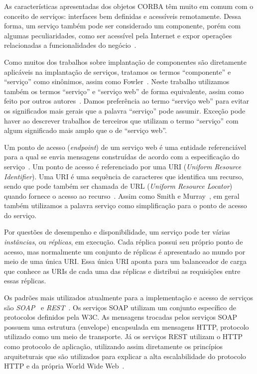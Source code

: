 As características apresentadas dos objetos CORBA têm muito em comum com o conceito de serviços: 
interfaces bem definidas e acessíveis remotamente.
Dessa forma, um serviço também pode ser considerado um componente, porém com algumas peculiaridades, 
como ser acessível pela Internet e expor operações relacionadas a funcionalidades do negócio~\cite{Hewitt2009JavaSOA}.

Como muitos dos trabalhos sobre implantação de componentes são diretamente aplicáveis na implantação de serviços, tratamos os termos ``componente'' e ``serviço'' como sinônimos, assim como Fowler~\cite{Fowler2004Inversion}. Neste trabalho utilizamos também os termos ``serviço'' e ``serviço web'' de forma equivalente, assim como feito por outros autores~\cite{Watson2006Dynasoar}. Damos preferência ao termo ``serviço web'' para evitar os significados mais gerais que a palavra ``serviço'' pode assumir. Exceção pode haver ao descrever trabalhos de terceiros que utilizam o termo ``serviço'' com algum significado mais amplo que o de ``serviço web''. 

Um ponto de acesso (\textit{endpoint}) de um serviço web é uma entidade referenciável para a qual se envia mensagens construídas de acordo com a especificação do serviço~\cite{W3C2004Addressing}. 
Um ponto de acesso é referenciado por uma URI (\emph{Uniform Resource Identifier}).
Uma URI é uma sequência de caracteres que identifica um recurso, sendo que pode também ser chamada de URL (\emph{Uniform Resource Locator}) quando fornece o acesso ao recurso~\cite{rfc3986}.
Assim como Smith e Murray~\cite{Smith2010Evolution}, em geral também utilizamos a palavra serviço como simplificação para o ponto de acesso do serviço. 

Por questões de desempenho e disponibilidade, um serviço pode ter várias \emph{instâncias}, ou \emph{réplicas},
em execução. Cada réplica possui seu próprio ponto de acesso, mas normalmente um conjunto de réplicas é apresentado
ao mundo por meio de uma única URI. Essa única URI aponta para um balanceador de carga que conhece
as URIs de cada uma das réplicas e distribui as requisições entre essas réplicas.

Os padrões mais utilizados atualmente para a implementação e acesso de serviços são \emph{SOAP}~\cite{W3C2007SOAP} e \emph{REST}~\cite{Roy2000REST}. Os serviços SOAP utilizam um conjunto específico de protocolos definidos pela W3C. As mensagens trocadas pelos serviços SOAP possuem uma estrutura (envelope) encapsulada em mensagens HTTP, protocolo utilizado como um meio de transporte. Já os serviços REST utilizam o HTTP como protocolo de aplicação, utilizando assim diretamente os princípios arquiteturais que são utilizados para explicar a alta escalabilidade do protocolo HTTP e da própria World Wide Web~\cite{Pautasso2008Restful}. 

